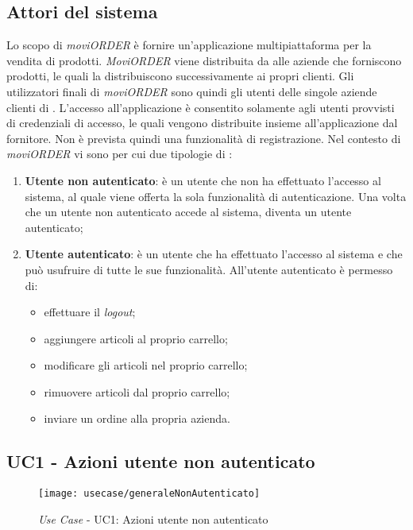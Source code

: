 \subsection{Attori del sistema}

Lo scopo di \textit{moviORDER} è fornire un'applicazione multipiattaforma per la vendita di prodotti. \textit{MoviORDER} viene distribuita da \visione{} alle aziende che forniscono prodotti, le quali la distribuiscono successivamente ai propri clienti. Gli utilizzatori finali di \textit{moviORDER} sono quindi gli utenti delle singole aziende clienti di \visione{}.
L'accesso all'applicazione è consentito solamente agli utenti provvisti di credenziali di accesso, le quali vengono distribuite insieme all'applicazione dal fornitore. Non è prevista quindi una funzionalità di registrazione. Nel contesto di \textit{moviORDER} vi sono per cui due tipologie di :
\begin{enumerate}
	\item \textbf{Utente non autenticato}: è un utente che non ha effettuato l'accesso al sistema, al quale viene offerta la sola funzionalità di autenticazione. Una volta che un utente non autenticato accede al sistema, diventa un utente autenticato;
	\item \textbf{Utente autenticato}: è un utente che ha effettuato l'accesso al sistema e che può usufruire di tutte le sue funzionalità. All'utente autenticato è permesso di:
	\begin{itemize}
		\item effettuare il \textit{logout};
		\item aggiungere articoli al proprio carrello;
		\item modificare gli articoli nel proprio carrello;
		\item rimuovere articoli dal proprio carrello;
		\item inviare un ordine alla propria azienda.
	\end{itemize}
\end{enumerate}

\subsection{UC1 - Azioni utente non autenticato}

\begin{figure}[!h] 
    \centering 
    \texttt{[image: usecase/generaleNonAutenticato]} 
    \caption{\textit{Use Case} - UC1: Azioni utente non autenticato}
\end{figure}

